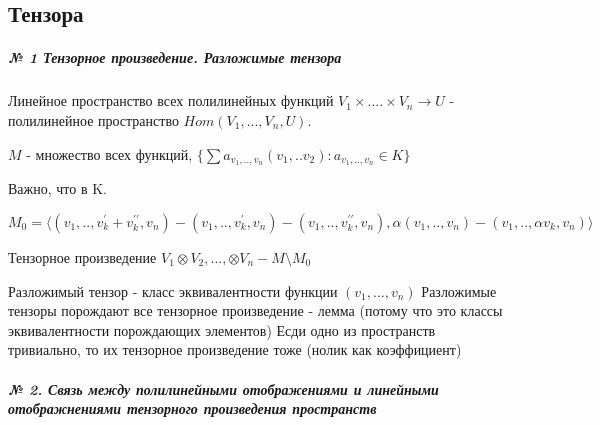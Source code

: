 \documentclass{article}
\begin{document}
\subsection{Тензора}

\tiny

\subparagraph{\tiny № 1 Тензорное произведение. Разложимые тензора}

\begin{flushleft}

Линейное пространство всех полилинейных функций $V_1 \times .... \times V_n \rightarrow U$ - полилинейное пространство $Hom(V_1, ..., V_n, U)$.

$M$ - множество всех функций, $\{ \sum{a_{v_1, .., v_n}(v_1, .. v_2)} : a_{v_1, .., v_n} \in K\}$

Важно, что в K.

$M_0 = \langle (v_1, .., v_k^\prime + v_k^{\prime \prime}, v_n) - (v_1, .., v_k^\prime , v_n) - (v_1, .., v_k^{\prime \prime}, v_n), \alpha(v_1, .., v_n) - (v_1, .., \alpha v_k, v_n) \rangle$

Тензорное произведение $V_1 \otimes V_2, ..., \otimes V_n - M \setminus M_0$

Разложимый тензор - класс эквивалентности функции $(v_1, ..., v_n)$
Разложимые тензоры порождают все тензорное произведение - лемма (потому что это классы эквивалентности порождающих элементов)
Есди одно из пространств тривиально, то их тензорное произведение тоже (нолик как коэффициент)

\end{flushleft}

\subparagraph{\tiny № 2. Связь между полилинейными отображениями и линейными отображнениями тензорного произведения пространств}
\end{document}
